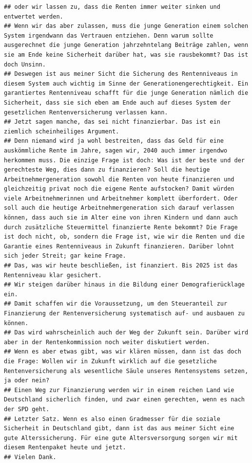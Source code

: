 \documentclass[oneside, 12pt, numbers=endperiod]{scrbook}
\theoremstyle{definition}
\theoremstyle{definition}
\theoremstyle{definition}
\theoremstyle{remark}
\begin{document}
\begin{verbatim}
## oder wir lassen zu, dass die Renten immer weiter sinken und entwertet werden. 
## Wenn wir das aber zulassen, muss die junge Generation einem solchen System irgendwann das Vertrauen entziehen. Denn warum sollte ausgerechnet die junge Generation jahrzehntelang Beiträge zahlen, wenn sie am Ende keine Sicherheit darüber hat, was sie rausbekommt? Das ist doch Unsinn. 
## Deswegen ist aus meiner Sicht die Sicherung des Rentenniveaus in diesem System auch wichtig im Sinne der Generationengerechtigkeit. Ein garantiertes Rentenniveau schafft für die junge Generation nämlich die Sicherheit, dass sie sich eben am Ende auch auf dieses System der gesetzlichen Rentenversicherung verlassen kann. 
## Jetzt sagen manche, das sei nicht finanzierbar. Das ist ein ziemlich scheinheiliges Argument. 
## Denn niemand wird ja wohl bestreiten, dass das Geld für eine auskömmliche Rente im Jahre, sagen wir, 2040 auch immer irgendwo herkommen muss. Die einzige Frage ist doch: Was ist der beste und der gerechteste Weg, dies dann zu finanzieren? Soll die heutige Arbeitnehmergeneration sowohl die Renten von heute finanzieren und gleichzeitig privat noch die eigene Rente aufstocken? Damit würden viele Arbeitnehmerinnen und Arbeitnehmer komplett überfordert. Oder soll auch die heutige Arbeitnehmergeneration sich darauf verlassen können, dass auch sie im Alter eine von ihren Kindern und dann auch durch zusätzliche Steuermittel finanzierte Rente bekommt? Die Frage ist doch nicht, ob, sondern die Frage ist, wie wir die Renten und die Garantie eines Rentenniveaus in Zukunft finanzieren. Darüber lohnt sich jeder Streit; gar keine Frage. 
## Das, was wir heute beschließen, ist finanziert. Bis 2025 ist das Rentenniveau klar gesichert. 
## Wir steigen darüber hinaus in die Bildung einer Demografierücklage ein. 
## Damit schaffen wir die Voraussetzung, um den Steueranteil zur Finanzierung der Rentenversicherung systematisch auf- und ausbauen zu können. 
## Das wird wahrscheinlich auch der Weg der Zukunft sein. Darüber wird aber in der Rentenkommission noch weiter diskutiert werden. 
## Wenn es aber etwas gibt, was wir klären müssen, dann ist das doch die Frage: Wollen wir in Zukunft wirklich auf die gesetzliche Rentenversicherung als wesentliche Säule unseres Rentensystems setzen, ja oder nein? 
## Einen Weg zur Finanzierung werden wir in einem reichen Land wie Deutschland sicherlich finden, und zwar einen gerechten, wenn es nach der SPD geht. 
## Letzter Satz. Wenn es also einen Gradmesser für die soziale Sicherheit in Deutschland gibt, dann ist das aus meiner Sicht eine gute Alterssicherung. Für eine gute Altersversorgung sorgen wir mit diesem Rentenpaket heute und jetzt. 
## Vielen Dank.
\end{verbatim}
\end{document}
